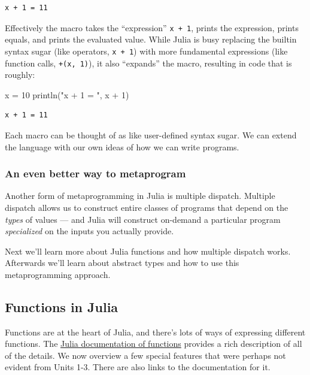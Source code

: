 \documentclass[
]{article}
\newenvironment{Shaded}{\begin{snugshade}}{\end{snugshade}}
\newcommand{\FloatTok}[1]{\textcolor[rgb]{0.68,0.00,0.00}{#1}}
\newcommand{\FunctionTok}[1]{\textcolor[rgb]{0.28,0.35,0.67}{#1}}
\newcommand{\NormalTok}[1]{\textcolor[rgb]{0.00,0.23,0.31}{#1}}
\newcommand{\OperatorTok}[1]{\textcolor[rgb]{0.37,0.37,0.37}{#1}}
\newcommand{\StringTok}[1]{\textcolor[rgb]{0.13,0.47,0.30}{#1}}
\begin{document}
\begin{verbatim}
x + 1 = 11
\end{verbatim}

Effectively the macro takes the ``expression'' \texttt{x\ +\ 1}, prints
the expression, prints equals, and prints the evaluated value. While
Julia is busy replacing the builtin syntax sugar (like operators,
\texttt{x\ +\ 1}) with more fundamental expressions (like function
calls, \texttt{+(x,\ 1)}), it also ``expands'' the macro, resulting in
code that is roughly:

\begin{Shaded}
\begin{Highlighting}[]
\NormalTok{x }\OperatorTok{=} \FloatTok{10}
\FunctionTok{println}\NormalTok{(}\StringTok{"x + 1 = "}\NormalTok{, x }\OperatorTok{+} \FloatTok{1}\NormalTok{)}
\end{Highlighting}
\end{Shaded}

\begin{verbatim}
x + 1 = 11
\end{verbatim}

Each macro can be thought of as like user-defined syntax sugar. We can
extend the language with our own ideas of how we can write programs.

\subsubsection{An even better way to
metaprogram}\label{an-even-better-way-to-metaprogram}

Another form of metaprogramming in Julia is multiple dispatch. Multiple
dispatch allows us to construct entire classes of programs that depend
on the \emph{types} of values --- and Julia will construct on-demand a
particular program \emph{specialized} on the inputs you actually
provide.

Next we'll learn more about Julia functions and how multiple dispatch
works. Afterwards we'll learn about abstract types and how to use this
metaprogramming approach.

\subsection{Functions in Julia}\label{functions-in-julia}

Functions are at the heart of Julia, and there's lots of ways of
expressing different functions. The
\href{https://docs.julialang.org/en/v1/manual/functions/}{Julia
documentation of functions} provides a rich description of all of the
details. We now overview a few special features that were perhaps not
evident from Units 1-3. There are also links to the documentation for
it.
\end{document}
